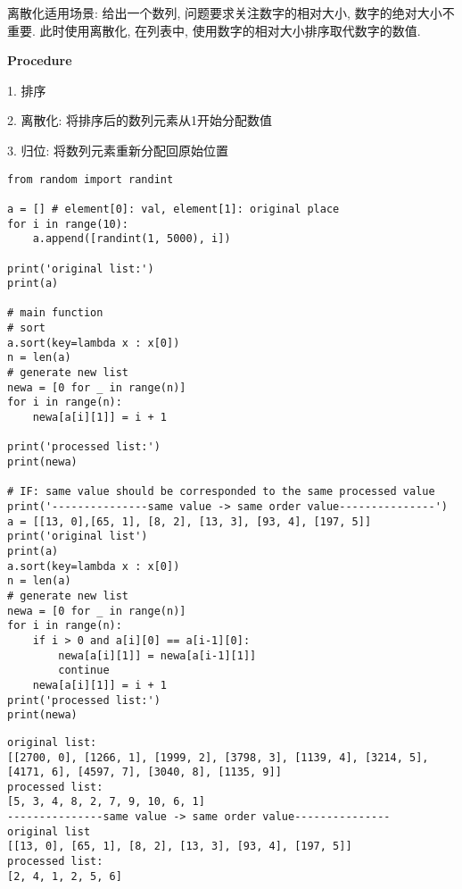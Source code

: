 \documentclass[../main]{subfiles}
\begin{document}
\begin{sloppy}
离散化适用场景: 给出一个数列, 问题要求关注数字的相对大小, 数字的绝对大小不重要. 此时使用离散化, 在列表中, 使用数字的相对大小排序取代数字的数值.

\textbf{Procedure}

1. 排序

2. 离散化: 将排序后的数列元素从1开始分配数值

3. 归位: 将数列元素重新分配回原始位置

\begin{lstlisting}[style = Python]
from random import randint

a = [] # element[0]: val, element[1]: original place
for i in range(10):
    a.append([randint(1, 5000), i])

print('original list:')
print(a)

# main function
# sort
a.sort(key=lambda x : x[0])
n = len(a)
# generate new list
newa = [0 for _ in range(n)]
for i in range(n):
    newa[a[i][1]] = i + 1

print('processed list:')
print(newa)

# IF: same value should be corresponded to the same processed value
print('---------------same value -> same order value---------------')
a = [[13, 0],[65, 1], [8, 2], [13, 3], [93, 4], [197, 5]]
print('original list')
print(a)
a.sort(key=lambda x : x[0])
n = len(a)
# generate new list
newa = [0 for _ in range(n)]
for i in range(n):
    if i > 0 and a[i][0] == a[i-1][0]:
        newa[a[i][1]] = newa[a[i-1][1]]
        continue
    newa[a[i][1]] = i + 1
print('processed list:')
print(newa)
\end{lstlisting}

\begin{verbatim}
original list:
[[2700, 0], [1266, 1], [1999, 2], [3798, 3], [1139, 4], [3214, 5], 
[4171, 6], [4597, 7], [3040, 8], [1135, 9]]
processed list:
[5, 3, 4, 8, 2, 7, 9, 10, 6, 1]
---------------same value -> same order value---------------
original list
[[13, 0], [65, 1], [8, 2], [13, 3], [93, 4], [197, 5]]
processed list:
[2, 4, 1, 2, 5, 6]
\end{verbatim}




\end{sloppy}
\end{document}
